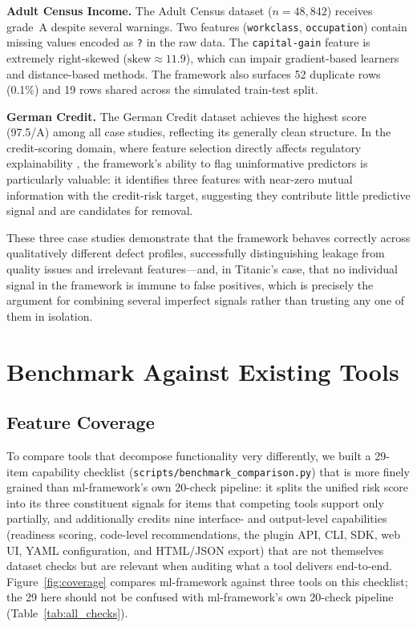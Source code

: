 \documentclass[12pt,a4paper]{report}
\begin{document}
\textbf{Adult Census Income.}  The Adult Census dataset ($n{=}48{,}842$) receives grade~A
despite several warnings.  Two features (\texttt{workclass}, \texttt{occupation}) contain
missing values encoded as \texttt{?} in the raw data.  The \texttt{capital-gain} feature
is extremely right-skewed ($\text{skew}\approx11.9$), which can impair gradient-based
learners and distance-based methods.  The framework also surfaces 52 duplicate rows (0.1\%)
and 19 rows shared across the simulated train-test split.

\textbf{German Credit.}  The German Credit dataset achieves the highest score (97.5/A)
among all case studies, reflecting its generally clean structure.  In the credit-scoring
domain, where feature selection directly affects regulatory explainability
\cite{siddiqi2006}, the framework's ability to flag uninformative predictors is
particularly valuable: it identifies three features with near-zero mutual information
with the credit-risk target, suggesting they contribute little predictive signal and are
candidates for removal.

These three case studies demonstrate that the framework behaves correctly across
qualitatively different defect profiles, successfully distinguishing leakage from quality
issues and irrelevant features---and, in Titanic's case, that no individual signal in the
framework is immune to false positives, which is precisely the argument for combining
several imperfect signals rather than trusting any one of them in isolation.

\section{Benchmark Against Existing Tools}
\label{sec:benchmark}

\subsection{Feature Coverage}

To compare tools that decompose functionality very differently, we built a 29-item
capability checklist (\texttt{scripts/benchmark\_comparison.py}) that is more finely
grained than ml-framework's own 20-check pipeline: it splits the unified risk score into
its three constituent signals for items that competing tools support only partially, and
additionally credits nine interface- and output-level capabilities (readiness scoring,
code-level recommendations, the plugin API, CLI, SDK, web UI, YAML configuration, and
HTML/JSON export) that are not themselves dataset checks but are relevant when auditing
what a tool delivers end-to-end.  Figure~\ref{fig:coverage} compares ml-framework against
three tools on this checklist; the 29 here should not be confused with ml-framework's own
20-check pipeline (Table~\ref{tab:all_checks}).
\end{document}

